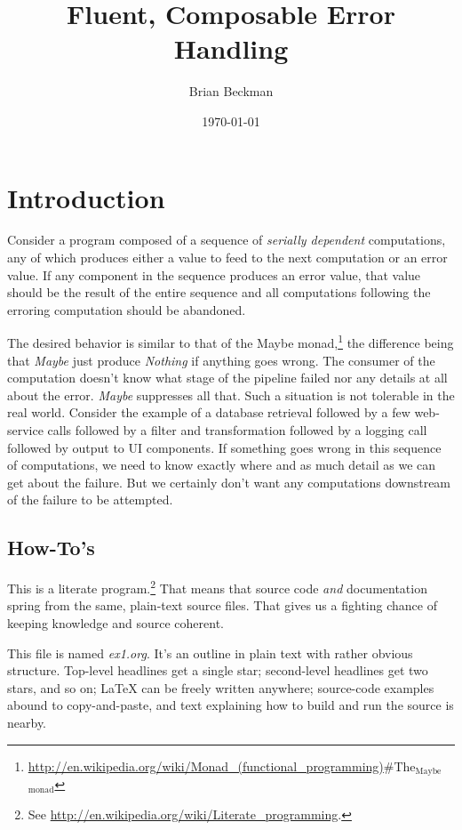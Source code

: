 \documentclass[11pt]{article}
\author{Brian Beckman}
\date{\today}
\title{Fluent, Composable Error Handling}
\begin{document}
\maketitle
\tableofcontents


\section{Introduction}
\label{sec-1}

Consider a program composed of a sequence of \emph{serially dependent}
computations, any of which produces either a value to feed to the
next computation or an error value. If any component in the sequence
produces an error value, that value should be the result of the
entire sequence and all computations following the erroring
computation should be abandoned.

The desired behavior is similar to that of the Maybe
monad,\footnote{\url{http://en.wikipedia.org/wiki/Monad_(functional_programming)}\#The$_{\text{Maybe}}$$_{\text{monad}}$}
the difference being that \emph{Maybe} just produce \emph{Nothing} if anything
goes wrong. The consumer of the computation doesn't know what stage
of the pipeline failed nor any details at all about the error.
\emph{Maybe} suppresses all that. Such a situation is not tolerable in
the real world. Consider the example of a database retrieval
followed by a few web-service calls followed by a filter and
transformation followed by a logging call followed by output to UI
components. If something goes wrong in this sequence of
computations, we need to know exactly where and as much detail as
we can get about the failure. But we certainly don't want any
computations downstream of the failure to be attempted.


\subsection{How-To's}
\label{sec-1-1}
This is a literate program.\footnote{See
  \url{http://en.wikipedia.org/wiki/Literate_programming}.} That means that
source code \emph{and} documentation spring from the same, plain-text
source files. That gives us a fighting chance of keeping knowledge
and source coherent.

This file is named \emph{ex1.org}. It's an outline in plain text with
rather obvious structure. Top-level headlines get a single star;
second-level headlines get two stars, and so on; \LaTeX{} can be
freely written anywhere; source-code examples abound to
copy-and-paste, and text explaining how to build and run the source
is nearby.
\end{document}
